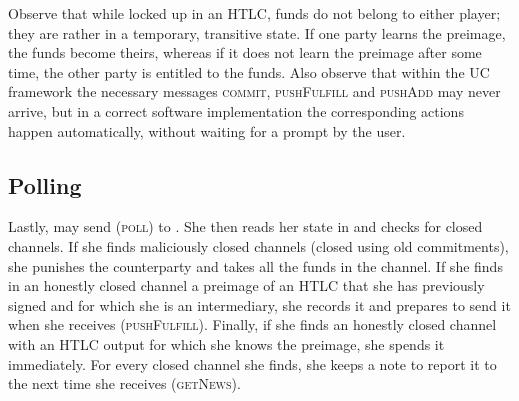     Observe that while locked up in an HTLC, funds do not belong to either
    player; they are rather in a temporary, transitive state. If one party
    learns the preimage, the funds become theirs, whereas if it does not learn
    the preimage after some time, the other party is entitled to the funds. Also
    observe that within the UC framework the necessary messages \textsc{commit},
    \textsc{pushFulfill} and \textsc{pushAdd} may never arrive, but in a
    correct software implementation the corresponding actions happen
    automatically, without waiting for a prompt by the user.

  \subsection{Polling}
    Lastly, \environment{} may send (\textsc{poll}) to \alice. She then reads
    her state in \ledger{} and checks for closed channels. If she finds
    maliciously closed channels (closed using old commitments), she punishes the
    counterparty and takes all the funds in the channel. If she finds in an
    honestly closed channel a preimage of an HTLC that she has previously
    signed and for which she is an intermediary, she records it and prepares to
    send it when she receives (\textsc{pushFulfill}). Finally, if she finds an
    honestly closed channel with an HTLC output for which she knows the
    preimage, she spends it immediately. For every closed channel she finds, she
    keeps a note to report it to \environment{} the next time she receives
    (\textsc{getNews}).

